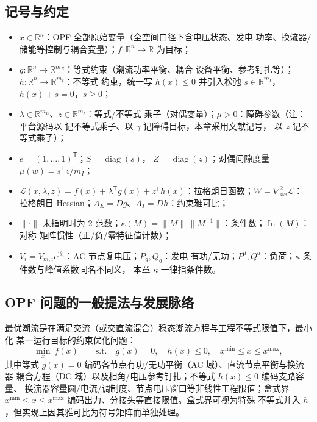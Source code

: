 \subsection{记号与约定}
\begin{itemize}
  \item $x\in\mathbb R^{n}$：OPF 全部原始变量（全空间口径下含电压状态、发电
        功率、换流器/储能等控制与耦合变量）；$f:\mathbb R^n\to\mathbb R$ 为目标；
  \item $g:\mathbb R^n\to\mathbb R^{m_E}$：等式约束（潮流功率平衡、耦合
        设备平衡、参考钉扎等）；$h:\mathbb R^n\to\mathbb R^{m_I}$：不等式
        约束，统一写 $h(x)\le0$ 并引入松弛 $s\in\mathbb R^{m_I}$，
        $h(x)+s=0$，$s\ge0$；
  \item $\lambda\in\mathbb R^{m_E}$、$z\in\mathbb R^{m_I}$：等式/不等式
        乘子（对偶变量）；$\mu>0$：障碍参数（注：平台源码以
         记不等式乘子、以 $\gamma$ 记障碍目标，本章采用文献记号，
        以 $z$ 记不等式乘子）；
  \item $e=(1,\dots,1)^{\mathsf T}$；$S=\operatorname{diag}(s)$，
        $Z=\operatorname{diag}(z)$；对偶间隙度量 $\mu(w)=s^{\mathsf T}z/m_I$；
  \item $\mathcal L(x,\lambda,z)=f(x)+\lambda^{\mathsf T}g(x)
        +z^{\mathsf T}h(x)$：拉格朗日函数；$W=\nabla_{xx}^2\mathcal L$：
        拉格朗日 Hessian；$A_E=Dg$、$A_I=Dh$：约束雅可比；
  \item $\lVert\cdot\rVert$ 未指明时为 $2$-范数；$\kappa(M)=\lVert
        M\rVert\,\lVert M^{-1}\rVert$：条件数；$\operatorname{In}(M)$：对称
        矩阵惯性（正/负/零特征值计数）；
  \item $V_i=V_{m,i}e^{\mathrm j\theta_i}$：AC 节点复电压；$P_g,Q_g$：发电
        有功/无功；$P^d,Q^d$：负荷；$\kappa$-条件数与峰值系数同名不同义，
        本章 $\kappa$ 一律指条件数。
\end{itemize}

\subsection{OPF 问题的一般提法与发展脉络}\label{sec:opf-th-gen-formulation}

\begin{definition}\label{def:opf-th-gen-standard}
最优潮流是在满足交流（或交直流混合）稳态潮流方程与工程不等式限值下，最小化
某一运行目标的约束优化问题：
\begin{equation}
\min_{x}\ f(x)\qquad
\text{s.t.}\quad g(x)=0,\quad h(x)\le0,\quad
x^{\min}\le x\le x^{\max},
\label{eq:opf-th-gen-standard}
\end{equation}
其中等式 $g(x)=0$ 编码各节点有功/无功平衡（AC 域）、直流节点平衡与换流器
耦合方程（DC 域）以及相角/电压参考钉扎；不等式 $h(x)\le0$ 编码支路容量、
换流器容量圆/电流/调制度、节点电压窗口等非线性工程限值；盒式界
$x^{\min}\le x\le x^{\max}$ 编码出力、分接头等直接限值。盒式界可视为特殊
不等式并入 $h$，但实现上因其雅可比为符号矩阵而单独处理。
\end{definition}

